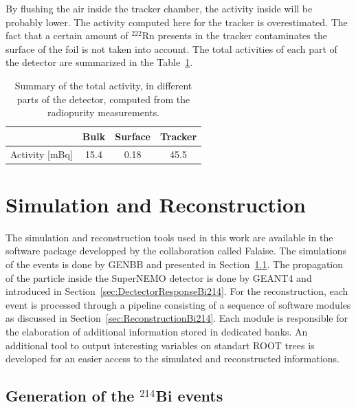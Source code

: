 \documentclass[main.tex]{subfiles}
\begin{document}
\noindent By flushing the air inside the tracker chamber, the activity inside will be probably lower. The activity computed here for the tracker is overestimated. The fact that a certain amount of $^{222}$Rn presents in the tracker contaminates the surface of the foil is not taken into account. The total activities of each part of the detector are summarized in the Table~\ref{activity_measurement_different_parts}.

\begin{table}[h!]
\begin{center}
\begin{tabular}{c|c|c|c}
               & Bulk & Surface & Tracker \\[0.1cm]
\hline
Activity [mBq] & 15.4 & 0.18    & 45.5    \\[0.1cm]
\hline
\end{tabular}
\end{center}
\caption{Summary of the total activity, in different parts of the detector, computed from the radiopurity measurements.}
\label{activity_measurement_different_parts}
\end{table}



\section{Simulation and Reconstruction}\label{sec:SimuReco}


\noindent The simulation and reconstruction tools used in this work are available in the software package developped by the collaboration called Falaise. The simulations of the events is done by GENBB and presented in Section~\ref{sec:GenerationBi214}. The propagation of the particle inside the SuperNEMO detector is done by GEANT4 and introduced in Section~\ref{sec:DectectorResponseBi214}. For the reconstruction, each event is processed through a pipeline consisting of a sequence of software modules as discussed in Section~\ref{sec:ReconstructionBi214}. Each module is responsible for the elaboration of additional information stored in dedicated banks. An additional tool to output interesting variables on standart ROOT trees is developed for an easier access to the simulated and reconstructed informations.


\subsection{Generation of the $^{\text{214}}$Bi events}\label{sec:GenerationBi214}
\end{document}
